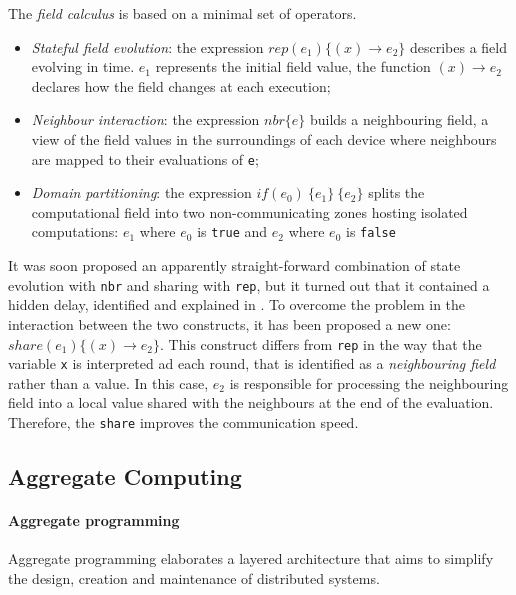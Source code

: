 The \emph{field calculus} is based on a minimal set of operators.
\begin{itemize}
    \item \emph{Stateful field evolution}: the expression $rep(e_1)\{(x) \rightarrow e_2\}$ describes a field evolving in time.
        $e_1$ represents the initial field value, the function $(x) \rightarrow e_2$ declares how the field changes
        at each execution;
    \item \emph{Neighbour interaction}: the expression $nbr\{e\}$ builds a neighbouring field, a view of the field
        values in the surroundings of each device where neighbours are mapped to their evaluations of \texttt{e};
    \item \emph{Domain partitioning}: the expression $if(e_0)\ \{e_1\}\ \{e_2\}$ splits the computational field into
        two non-communicating zones hosting isolated computations: $e_1$ where  $e_0$ is \texttt{true} and
        $e_2$ where  $e_0$ is \texttt{false}
\end{itemize}

It was soon proposed an apparently straight-forward combination of state evolution with \texttt{nbr} and sharing with \texttt{rep},
but it turned out that it contained a hidden delay, identified and explained in \cite{fieldc}.
To overcome the problem in the interaction between the two constructs, it has been proposed a new one:
$share(e_1)\{(x) \rightarrow e_2\}$.
This construct differs from \texttt{rep} in the way that the variable \texttt{x} is interpreted ad each round, that is
identified as a \emph{neighbouring field} rather than a value.
In this case, $e_2$ is responsible for processing the neighbouring field into a local value shared with the
neighbours at the end of the evaluation.
Therefore, the \texttt{share} improves the communication speed.

\subsection{Aggregate Computing}
\label{subsec:aggregate-computing}

\paragraph{Aggregate programming}
Aggregate programming elaborates a layered architecture that aims to simplify the design, creation and maintenance of
distributed systems.

